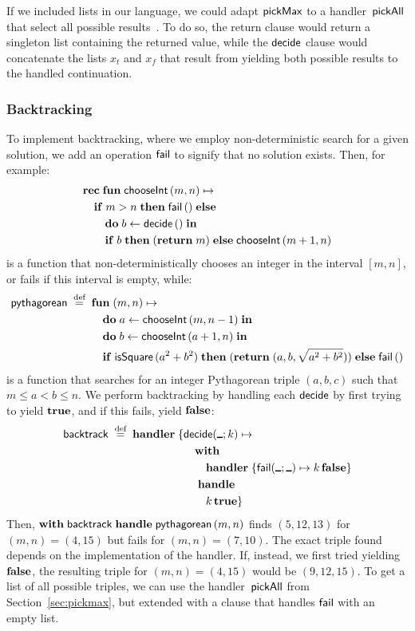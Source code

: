 \documentclass{article}
\begin{document}
If we included lists in our language, we could adapt $\mathord{\mathsf{pickMax}}$ to a handler~$\mathord{\mathsf{pickAll}}$ that select all possible results~\cite{DBLP:journals/jlp/BauerP15}. To do so, the return clause would return a singleton list containing the returned value, while the $\mathsf{decide}$ clause would concatenate the lists $x_t$ and $x_f$ that result from yielding both possible results to the handled continuation.

\subsubsection{Backtracking}
\label{sec:backtrack}

To implement backtracking, where we employ non-deterministic search for a given
solution, we add an operation $\mathsf{fail}$ to signify that no solution exists. Then,
for example:
%
\begin{align*}
  &\recfun{\kst{chooseInt}}{(m, n)} \\
  &\quad \conditional{m > n}{\fail \, \unt}{ \\
  &\quad\quad \seq{b}{\decide \, \unt} \\
  &\quad\quad \conditional{b}{(\return m)}{\kst{chooseInt} \, (m + 1, n)}
  }
\end{align*}
%
is a function that non-deterministically chooses an integer in the interval $[m, n]$,
or fails if this interval is empty, while:
%
\begin{align*}
  \mathord{\mathsf{pythagorean}} \mathrel{\;\stackrel{\text{def}}{=}\;} {} &\mathbf{fun}\; (m, n) \mapsto \\
  &\quad\mathbf{do}\; a \leftarrow \mathord{\mathsf{chooseInt}} \, (m, n - 1) \;\mathbf{in}\; \\
  &\quad\mathbf{do}\; b \leftarrow \mathord{\mathsf{chooseInt}} \, (a + 1, n) \;\mathbf{in}\; \\
  &\quad\mathbf{if}\; \mathord{\mathsf{isSquare}} \, (a^2 + b^2) \;\mathbf{then}\; (\mathbf{return}\; (a, b, \sqrt{a^2 + b^2})) \;\mathbf{else}\; \mathsf{fail} \, ()
\end{align*}
%
is a function that searches for an integer Pythagorean triple $(a, b, c)$ such that
${m \leq a < b \leq n}$.
We perform backtracking by handling each $\mathsf{decide}$ by first trying to yield
$\mathbf{true}$, and if this fails, yield $\mathbf{false}$:
%
\begin{align*}
  \kst{backtrack} \defeq \handler \{
  &\opclause[\decide]{\anon}{k} \\
  &\quad \withhandle{\\
  &\quad\quad \handler \{ \opclause[\fail]{\anon}{\anon} k \, \fls \} \\
  &\quad}{\\
  &\quad\quad k \, \tru} \}
\end{align*}
%
Then, $\mathbf{with}\; \mathord{\mathsf{backtrack}} \;\mathbf{handle}\; \mathord{\mathsf{pythagorean}} \, (m, n)$
finds $(5, 12, 13)$ for ${(m, n) = (4, 15)}$ but fails for $(m, n) = (7, 10)$.
The exact triple found depends on the implementation of the handler. If, instead, we first tried yielding $\mathbf{false}$, the resulting triple for $(m, n) = (4, 15)$ would be $(9, 12, 15)$. To get a list of all possible triples, we can use the handler~$\mathord{\mathsf{pickAll}}$ from Section~\ref{sec:pickmax}, but extended with a clause that handles $\mathsf{fail}$ with an empty list.
\end{document}

